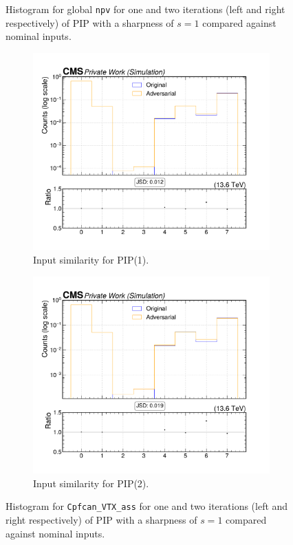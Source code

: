 \begin{figure}[htbp]
  \caption{Histogram for global \texttt{npv} for one and two iterations (left and right respectively) of PIP with a sharpness of $s=1$ compared against nominal inputs.}
  \label{fig:intprob_severity_npv}
  
  \begin{subfigure}[t]{0.5\textwidth}
    \includegraphics[width=\linewidth]{media/output/features/compare/intprob_1/cmp_cpf_arr_Cpfcan_VTX_ass.pdf}
    \caption{Input similarity for PIP(1).}
    \label{fig:left}
  \end{subfigure}\hfill
  \begin{subfigure}[t]{0.5\textwidth}
    \includegraphics[width=\linewidth]{media/output/features/compare/intprob_2/cmp_cpf_arr_Cpfcan_VTX_ass.pdf}
    \caption{Input similarity for PIP(2).}
  \end{subfigure}\hfill

  \caption{Histogram for \texttt{Cpfcan\_VTX\_ass} for one and two iterations (left and right respectively) of PIP with a sharpness of $s=1$ compared against nominal inputs.}
  \label{fig:intprob_severity_vtxAss}
\end{figure}

